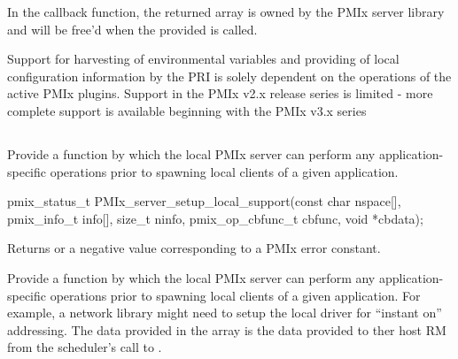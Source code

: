 In the callback function, the returned  array is owned by the PMIx server library and will be free'd when the provided  is called.

\adviceimplstart
Support for harvesting of environmental variables and providing of local configuration information by the \ac{PRI} is solely dependent on the operations of the active PMIx plugins. Support in the PMIx v2.x release series is limited - more complete support is available beginning with the PMIx v3.x series
\adviceimplend

\subsection{}

\summary

Provide a function by which the local PMIx server can perform any application-specific operations prior to spawning local clients of a given application.

\format

\cspecificstart
\begin{codepar}
pmix_status_t PMIx_server_setup_local_support(const char nspace[],
                                              pmix_info_t info[], size_t ninfo,
                                              pmix_op_cbfunc_t cbfunc, void *cbdata);
\end{codepar}
\cspecificend

\begin{arglist}
\end{arglist}

Returns  or a negative value corresponding to a PMIx error constant.


\descr

Provide a function by which the local PMIx server can perform any application-specific operations prior to spawning local clients of a given application. For example, a network library might need to setup the local driver for ``instant on'' addressing. The data provided in the  array is the data provided to ther host \ac{RM} from the scheduler's call to .


